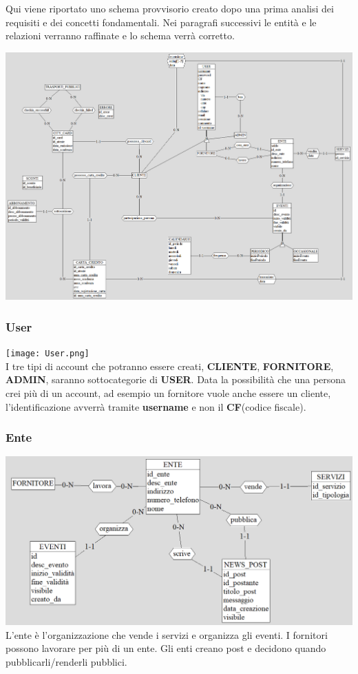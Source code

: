 Qui viene riportato uno schema provvisorio creato dopo una prima analisi dei requisiti e dei concetti fondamentali. 
Nei paragrafi successivi le entità e le relazioni verranno raffinate e lo schema verrà corretto.\\

\begin{center}
\centerline{\includegraphics[width=0.9\paperwidth]{images/schema_ER_iniziale.png}}
\end{center}

\subsubsection{User}
\texttt{[image: User.png]}\\
I tre tipi di account che potranno essere creati, \textbf{CLIENTE}, \textbf{FORNITORE}, \textbf{ADMIN},  saranno sottocategorie di \textbf{USER}. Data la possibilità che una persona crei più di un account, ad esempio un fornitore vuole anche essere un cliente, l'identificazione avverrà tramite \textbf{username} e non il \textbf{CF}(codice fiscale).



\subsubsection{Ente}
\includegraphics[width=0.95\columnwidth]{images/Ente.png} \\
L'ente è l'organizzazione che vende i servizi e organizza gli eventi. 
I fornitori possono lavorare per più di un ente.
Gli enti creano post e decidono quando pubblicarli/renderli pubblici. 


